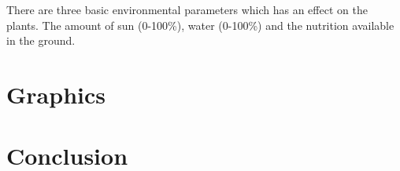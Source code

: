 \documentclass[conference]{acmsiggraph}
\begin{document}
There are three basic environmental parameters which has an effect on the
plants. The amount of sun (0-100\%), water (0-100\%) and the nutrition available
in the ground. 

\section{Graphics}

\section{Conclusion}




\end{document}
